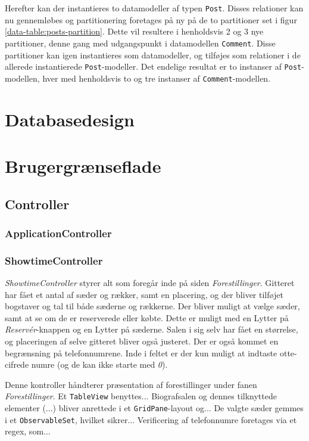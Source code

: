Herefter kan der instantieres to datamodeller af typen \texttt{Post}. Disses relationer kan nu gennemløbes og partitionering foretages på ny på de to partitioner set i figur \ref{data-table:posts-partition}. Dette vil resultere i henholdsvis 2 og 3 nye partitioner, denne gang med udgangspunkt i datamodellen \texttt{Comment}. Disse partitioner kan igen instantieres som datamodeller, og tilføjes som relationer i de allerede instantierede \texttt{Post}-modeller. Det endelige resultat er to instanser af \texttt{Post}-modellen, hver med henholdsvis to og tre instanser af \texttt{Comment}-modellen.

\section{Databasedesign}

\section{Brugergrænseflade}

\subsection{Controller}

\subsubsection{ApplicationController}

\subsubsection{ShowtimeController}

\textit{ShowtimeController} styrer alt som foregår inde på siden \textit{Forestillinger}. Gitteret har fået et antal af sæder og rækker, samt en placering, og der bliver tilføjet bogstaver og tal til både sæderne og rækkerne. Der bliver muligt at vælge sæder, samt at se om de er reserverede eller købte. Dette er muligt med en Lytter på \textit{Reservér}-knappen og en Lytter på sæderne. Salen i sig selv har fået en størrelse, og placeringen af selve gitteret bliver også justeret. Der er også kommet en begrænsning på telefonnumrene. Inde i feltet er der kun muligt at indtaste otte-cifrede numre (og de kan ikke starte med \textit{0}).

Denne kontroller håndterer præsentation af forestillinger under fanen \textit{Forestillinger}. Et \texttt{TableView} benyttes... Biografsalen og dennes tilknyttede elementer (...) bliver anrettede i et \texttt{GridPane}-layout og... De valgte sæder gemmes i et \texttt{ObservableSet}, hvilket sikrer... Verificering af telefonnumre foretages via et regex, som... 
  
